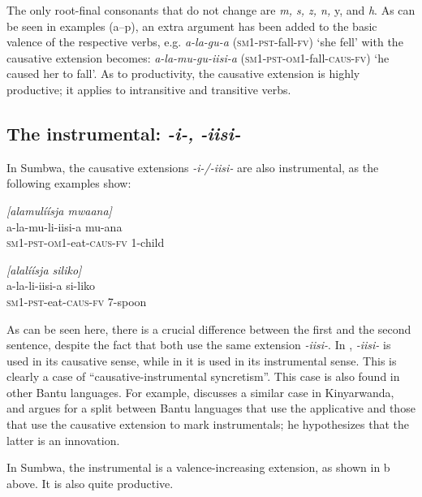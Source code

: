\documentclass[output=paper		  ]{langscibook}
\begin{document}
{The only root-final consonants that do not change are} {\textit{m, s, z, n,}} {y, and} {\textit{h}}{. As can be seen in examples (a--p), an extra argument has been added to the basic valence of the respective verbs, e.g.} {\textit{a-la-gu-a} }\textsc{(sm1-pst-}fall-\textsc{fv}) ‘she fell’ with the causative extension becomes: {\textit{a-la-mu-gu-iisi-a} }\textsc{(sm1-pst-om1}-fall-\textsc{caus-fv}) ‘he caused her to fall’. As to productivity, the causative extension is highly productive; it applies to intransitive and transitive verbs.

\subsection{The instrumental: \textit{-i-,} \textit{-iisi-}}\label{sec:kahigi:2.4}

{In Sumbwa, the causative extensions} {\textit{{}-i-/-iisi-}} {are also instrumental, as the following examples show:}

\ea\label{ex:kahigi:9}
    \ea\label{ex:kahigi:9a} \textit{[alamulíísja mwaana]}\\
 \gll a-la-mu-li-iisi-a                mu-ana\\
 \textsc{sm1-pst-om1-}eat-\textsc{caus-fv}   1-child\\

    \ex\label{ex:kahigi:9b} \textit{[alalíísja siliko]}\\
 \gll a-la-li-iisi-a                si-liko\\
 \textsc{sm1-pst-}eat\textsc{-caus-fv}   7-spoon\\
    \z
\z

{As can be seen here, there is a crucial difference between the first and the second sentence, despite the fact that both use the same extension} {\textit{{}-iisi-}}{. In ,} {\textit{{}-iisi-}} {is used in its causative sense, while in  it is used in its instrumental sense. This is clearly a case of ``causative-instrumental syncretism''. This case is also found in other Bantu languages. For example, \citet{Jerro2017} discusses a similar case in Kinyarwanda, and \citet{Wald1998} argues for a split between Bantu languages that use the applicative and those that use the causative extension to mark instrumentals; he hypothesizes that the latter is an innovation.}

{In Sumbwa, the instrumental is a valence-increasing extension, as shown in b above. It is also quite productive.} 
\end{document}
